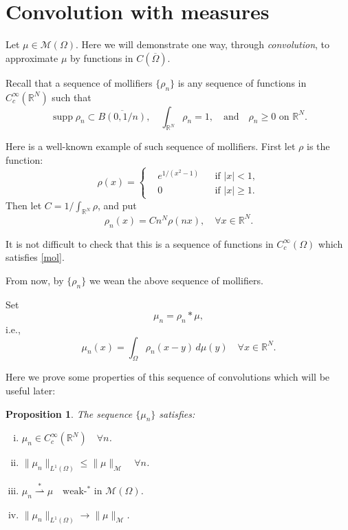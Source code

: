 \documentclass[a4paper, 11pt]{report}
\newtheorem{prn}{Proposition}[chapter]
\theoremstyle{definition}\newtheorem*{rmk}{Remark}
\DeclareMathOperator{\supp}{supp}
\begin{document}
\section{Convolution with measures}
\mbox{}

Let $\mu \in \mathcal{M}(\Omega)$. Here we will demonstrate one way, through \emph{convolution}, to approximate $\mu$ by functions in $C(\overline{\Omega})$.

Recall that a sequence of mollifiers $\{\rho_n\}$ is any sequence of functions in $C_c^{\infty}(\mathbb{R}^N)$ such that
\begin{equation}\label{mol}
\supp \rho_n \subset \overline{B(0, 1/n)},\quad\int_{\mathbb{R}^N}\rho_n = 1 ,\quad\text{and}\quad \rho_n \ge 0 \text{ on } \mathbb{R}^N.
\end{equation}

Here is a well-known example of such sequence of mollifiers. First let $\rho$ is the function:
\[
\rho(x) = \left\{
\begin{aligned}
&e^{1/(x^2 -1)}&&\text{if } |x|< 1 , \\
& 0&&\text{if } |x|\ge 1.
\end{aligned}
\right.
\]
Then let $C = 1/\int_{\mathbb{R}^N}\rho$, and put 
\[
\rho_n(x) = Cn^N\rho(nx), \quad \forall x\in\mathbb{R}^N.
\]

It is not difficult to check that this is a sequence of functions in $C_c^{\infty}(\Omega)$ which satisfies \eqref{mol}.

From now, by $\{\rho_n\}$ we wean the above sequence of mollifiers.

Set 
\begin{equation}\label{conv}
\mu_n = \rho_n * \mu ,
\end{equation}
i.e.,
\[
\mu_n(x) = \int_{\Omega} \rho_n(x-y) \,d\mu(y)\quad \forall x\in \mathbb{R}^N.
\]

Here we prove some properties of this sequence of convolutions which will be useful later:

\begin{prn}\label{convthm}
The sequence $\{\mu_n\}$ satisfies:
\begin{enumerate}[i)]
\item $\mu_n \in C_c^{\infty}(\mathbb{R}^N)\quad \forall n$.
\item $\| \mu_n\|_{L^1(\Omega)} \le \| \mu\|_{\mathcal{M}}\quad \forall n$.
\item $\mu_n \overset{*}{\rightharpoonup} \mu\quad \text{weak-$^*$ in } \mathcal{M}(\Omega)$.
\item $\| \mu_n\|_{L^1(\Omega)}  \to \| \mu\|_{\mathcal{M}}$.
\end{enumerate}
\end{prn}
\end{document}
